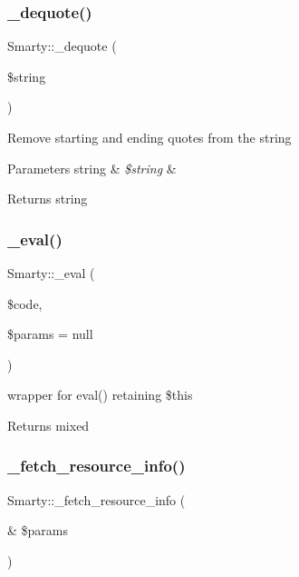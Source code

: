 \subsubsection{\texorpdfstring{\+\_\+dequote()}{\_dequote()}}
{\footnotesize\ttfamily Smarty\+::\+\_\+dequote (\begin{DoxyParamCaption}\item[{}]{\$string }\end{DoxyParamCaption})}

Remove starting and ending quotes from the string


\begin{DoxyParams}[1]{Parameters}
string & {\em \$string} & \\
\hline
\end{DoxyParams}
\begin{DoxyReturn}{Returns}
string 
\end{DoxyReturn}
\mbox{\label{class_smarty_ad837e8e78c6f5628cb52f4b69dc1d96c}} 
\subsubsection{\texorpdfstring{\+\_\+eval()}{\_eval()}}
{\footnotesize\ttfamily Smarty\+::\+\_\+eval (\begin{DoxyParamCaption}\item[{}]{\$code,  }\item[{}]{\$params = {\ttfamily null} }\end{DoxyParamCaption})}

wrapper for eval() retaining \$this \begin{DoxyReturn}{Returns}
mixed 
\end{DoxyReturn}
\mbox{\label{class_smarty_a78b2d264495ae2959a8e67e86bab9e20}} 
\subsubsection{\texorpdfstring{\+\_\+fetch\+\_\+resource\+\_\+info()}{\_fetch\_resource\_info()}}
{\footnotesize\ttfamily Smarty\+::\+\_\+fetch\+\_\+resource\+\_\+info (\begin{DoxyParamCaption}\item[{\&}]{\$params }\end{DoxyParamCaption})}

